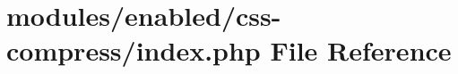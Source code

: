\hypertarget{modules_2enabled_2css-compress_2index_8php}{\section{modules/enabled/css-\/compress/index.php File Reference}
\label{modules_2enabled_2css-compress_2index_8php}
}
